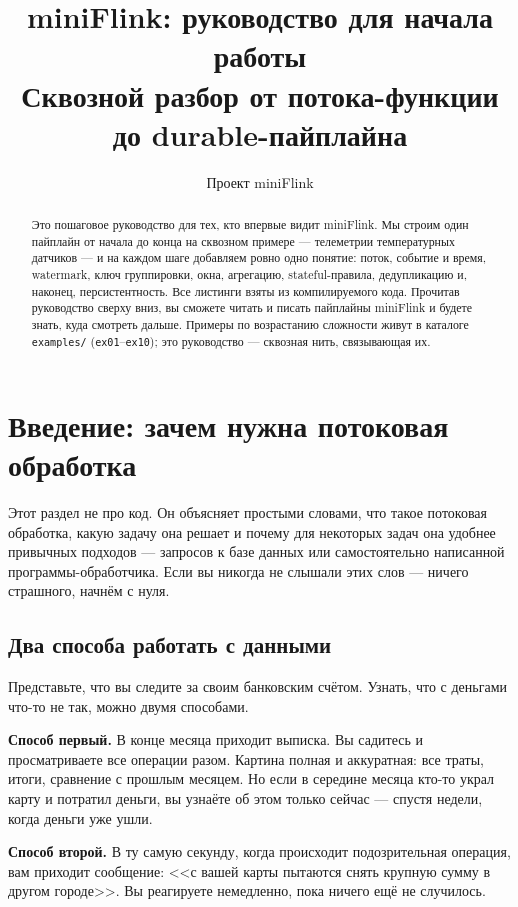 \documentclass[11pt,a4paper]{article}
\title{miniFlink: руководство для начала работы\\
\large Сквозной разбор от потока-функции до durable-пайплайна}
\author{Проект miniFlink}
\date{}
\begin{document}
\maketitle

\begin{abstract}
Это пошаговое руководство для тех, кто впервые видит miniFlink. Мы
строим один пайплайн от начала до конца на сквозном примере ---
телеметрии температурных датчиков --- и на каждом шаге добавляем ровно
одно понятие: поток, событие и время, watermark, ключ группировки,
окна, агрегацию, stateful-правила, дедупликацию и, наконец,
персистентность. Все листинги взяты из компилируемого кода. Прочитав
руководство сверху вниз, вы сможете читать и писать пайплайны miniFlink
и будете знать, куда смотреть дальше. Примеры по возрастанию сложности
живут в каталоге \texttt{examples/} (\texttt{ex01}--\texttt{ex10}); это
руководство --- сквозная нить, связывающая их.
\end{abstract}

\tableofcontents
\bigskip

\section{Введение: зачем нужна потоковая обработка}

Этот раздел не про код. Он объясняет простыми словами, что такое
потоковая обработка, какую задачу она решает и почему для некоторых
задач она удобнее привычных подходов --- запросов к базе данных или
самостоятельно написанной программы-обработчика. Если вы никогда не
слышали этих слов --- ничего страшного, начнём с нуля.

\subsection{Два способа работать с данными}

Представьте, что вы следите за своим банковским счётом. Узнать, что с
деньгами что-то не так, можно двумя способами.

\textbf{Способ первый.} В конце месяца приходит выписка. Вы садитесь и
просматриваете все операции разом. Картина полная и аккуратная: все
траты, итоги, сравнение с прошлым месяцем. Но если в середине месяца
кто-то украл карту и потратил деньги, вы узнаёте об этом только сейчас
--- спустя недели, когда деньги уже ушли.

\textbf{Способ второй.} В ту самую секунду, когда происходит
подозрительная операция, вам приходит сообщение: <<с вашей карты
пытаются снять крупную сумму в другом городе>>. Вы реагируете
немедленно, пока ничего ещё не случилось.
\end{document}
